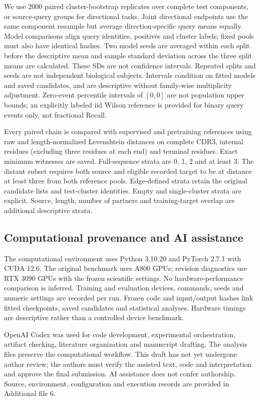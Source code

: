 \documentclass[12pt]{article}
\begin{document}
We use 2000 paired cluster-bootstrap replicates over complete test components,
or source-query groups for directional tasks. Joint directional endpoints use
the same component resample but average direction-specific query means equally.
Model comparisons align query identities, positives and cluster labels; fixed
pools must also have identical hashes. Two model seeds are averaged within each
split before the descriptive mean and sample standard deviation across the
three split means are calculated. These SDs are not confidence intervals.
Repeated splits and seeds are not independent biological subjects. Intervals
condition on fitted models and saved candidates, and are descriptive without
family-wise multiplicity adjustment. Zero-event percentile intervals of $[0,0]$
are not population upper bounds; an explicitly labeled iid Wilson reference is
provided for binary query events only, not fractional Recall.

Every paired chain is compared with supervised and pretraining references using
raw and length-normalized Levenshtein distances on complete CDR3, internal
residues (excluding three residues at each end) and terminal residues. Exact
minimum witnesses are saved. Full-sequence strata are 0, 1, 2 and at least 3.
The distant subset requires both source and eligible recorded target to be at
distance at least three from both reference pools. Edge-defined strata retain
the original candidate lists and test-cluster identities. Empty and single-cluster
strata are explicit. Source, length, number of partners and training-target
overlap are additional descriptive strata.

\subsection{Computational provenance and AI assistance}
The computational environment uses Python 3.10.20 and PyTorch 2.7.1 with CUDA
12.6. The original benchmark uses A800 GPUs; revision diagnostics use RTX 3090
GPUs with the frozen scientific settings. No hardware-performance
comparison is inferred. Training and evaluation devices, commands, seeds and numeric
settings are recorded per run. Frozen code and input/output hashes link fitted
checkpoints, saved candidates and statistical analyses. Hardware timings are
descriptive rather than a controlled device benchmark.

OpenAI Codex was used for code development, experimental orchestration, artifact
checking, literature organization and manuscript drafting. The analysis files
preserve the computational workflow. This draft has not yet undergone author
review; the authors must verify the assisted text, code and interpretation and
approve the final submission. AI assistance does not confer authorship.
Source, environment, configuration and execution records are provided in
Additional file 6.
\end{document}
